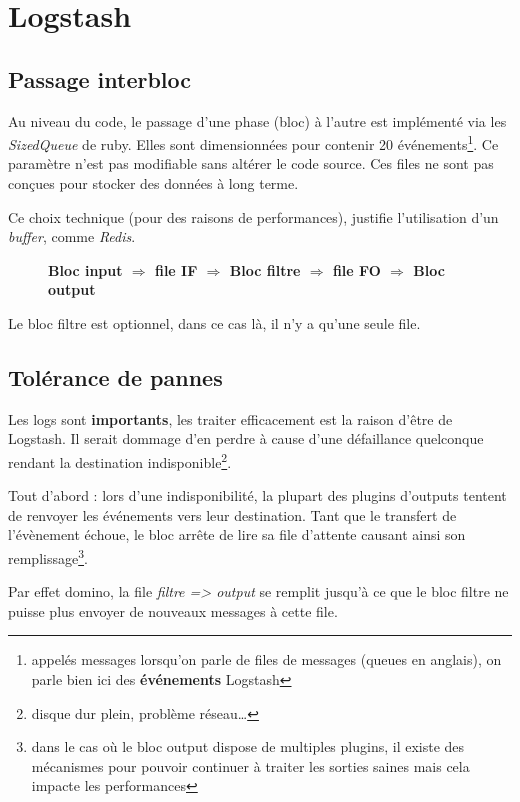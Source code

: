\section{Logstash}
\subsection{Passage interbloc}
\label{subsec:passageinterbloc}
Au niveau du code, le passage d'une phase (bloc) à l'autre est implémenté via les \emph{SizedQueue} 
de ruby. Elles sont dimensionnées pour contenir 20 événements\footnote{appelés messages 
lorsqu'on parle de files de messages (queues en anglais), on parle bien ici 
des \textbf{événements} Logstash}. Ce paramètre n'est pas modifiable sans altérer 
le code source. Ces files ne sont pas conçues pour stocker des données à long terme. 

Ce choix technique (pour des raisons de performances), justifie l'utilisation d'un 
\textit{buffer}, comme \emph{Redis}.

\begin{figure}[H]
\center
\textbf{Bloc input $\Rightarrow$ file IF $\Rightarrow$ Bloc filtre $\Rightarrow$  file FO $\Rightarrow$ Bloc output}\\
\end{figure}
{\footnotesize Le bloc filtre est optionnel, dans ce cas là, il n'y a qu'une seule file.}

\subsection{Tolérance de pannes}
Les logs sont \textbf{importants}, les traiter efficacement est la raison d'être 
de Logstash. Il serait dommage d'en perdre à cause d'une défaillance quelconque 
rendant la destination indisponible\footnote{disque dur plein, problème réseau\ldots}.

Tout d'abord : lors d'une indisponibilité, la plupart des plugins d'outputs tentent 
de renvoyer les événements vers leur destination. 
Tant que le transfert de l'évènement échoue, le bloc arrête de lire sa file d'attente
causant ainsi son remplissage\footnote{dans le cas où le bloc output dispose de  
multiples plugins, il existe des mécanismes pour pouvoir continuer à traiter les 
sorties saines mais cela impacte les performances}.

Par effet domino, la file \textit{filtre => output} se remplit jusqu'à ce que le 
bloc filtre ne puisse plus envoyer de nouveaux messages à cette file. 

